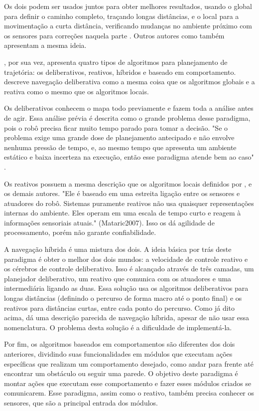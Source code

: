 Os dois podem ser usados juntos para obter melhores resultados, usando o global para definir o caminho completo, traçando longas distâncias, e o local para a movimentação a curta distância, verificando mudanças no ambiente próximo com os sensores para correções naquela parte \cite{Souza2008}. Outros autores como \cite{Secchi2008} também apresentam a mesma ideia.

\cite{Mataric2007}, por sua vez, apresenta quatro tipos de algoritmos para planejamento de trajetória: os deliberativos, reativos, híbridos e baseado em comportamento. \cite{Guzman2008} descreve navegação deliberativa como a mesma coisa que os algoritmos globais e a reativa como o mesmo que os algoritmos locais.

Os deliberativos conhecem o mapa todo previamente e fazem toda a análise antes de agir. Essa análise prévia é descrita como o grande problema desse paradigma, pois o robô precisa ficar muito tempo parado para tomar a decisão. "Se o problema exige uma grande dose de planejamento antecipado e não envolve nenhuma pressão de tempo, e, ao mesmo tempo que apresenta um ambiente estático e baixa incerteza na execução, então esse paradigma atende bem ao caso" \cite{Mataric2007}. 

Os reativos possuem a mesma descrição que os algoritmos locais definidos por \cite{Guzman2008}, \cite{Souza2008} e os demais autores. "Ele é baseado em uma estreita ligação entre os sensores e atuadores do robô. Sistemas puramente reativos não usa quaisquer representações internas do ambiente. Eles operam em uma escala de tempo curto e reagem à informações sensoriais atuais." ({Mataric2007}). Isso os dá agilidade de processamento, porém não garante confiabilidade.

A navegação híbrida é uma mistura dos dois. A ideia básica por trás deste paradigma é obter o melhor dos dois mundos: a velocidade de controle reativo e os cérebros de controle deliberativo. Isso é alcançado através de três camadas, um planejador deliberativo, um reativo que comunica com os atuadores e uma intermediária ligando as duas. Essa solução usa os algoritmos deliberativos para longas distâncias (definindo o percurso de forma macro até o ponto final) e os reativos para distâncias curtas, entre cada ponto do percurso. Como já dito acima, \cite{Souza2008} dá uma descrição parecida de navegação híbrida, apesar de não usar essa nomenclatura. O problema desta solução é a dificuldade de implementá-la.

Por fim, os algoritmos baseados em comportamentos são diferentes dos dois anteriores, dividindo suas funcionalidades em módulos que executam ações específicas que realizam um comportamento desejado, como andar para frente até encontrar um obstáculo ou seguir uma parede. O objetivo deste paradigma é montar ações que executam esse comportamento e fazer esses módulos criados se comunicarem. Esse paradigma, assim como o reativo, também precisa conhecer os sensores, que são a principal entrada dos módulos.

